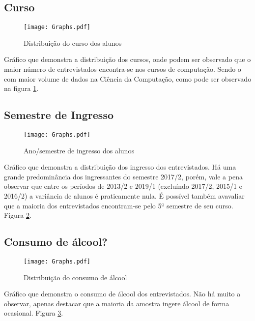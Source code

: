 \documentclass[11pt]{scrartcl} %
\begin{document}
\clearpage

\subsection{Curso}

\begin{figure}[h]
  \centering
  \texttt{[image: Graphs.pdf]}
  \caption{Distribuição do curso dos alunos}
  \label{fig:graph1}
\end{figure}

Gráfico que demonstra a distribuição dos cursos, onde podem ser observado que o maior número de entrevistados encontra-se nos cursos de computação. Sendo o com maior volume de dados na Ciência da Computação, como pode ser observado na figura \ref{fig:graph1}.

\clearpage

\subsection{Semestre de Ingresso}

\begin{figure}[h]
  \centering
  \texttt{[image: Graphs.pdf]}
  \label{fig:graph2}
  \caption{Ano/semestre de ingresso dos alunos}
\end{figure}

Gráfico que demonstra a distribuição dos ingresso dos entrevistados. Há uma grande predominância dos ingressantes do semestre 2017/2, porém, vale a pena observar que entre os períodos de 2013/2 e 2019/1 (excluíndo 2017/2, 2015/1 e 2016/2) a variância de alunos é praticamente nula. É possível também avavaliar que a maioria dos entrevistados encontram-se pelo 5º semestre de seu curso. Figura \ref{fig:graph2}.

\clearpage

\subsection{Consumo de álcool?}

\begin{figure}[h]
  \centering
  \texttt{[image: Graphs.pdf]}
  \label{fig:graph3}
  \caption{Distribuição do consumo de álcool}
\end{figure}

Gráfico que demonstra o consumo de álcool dos entrevistados. Não há muito a observar, apenas destacar que a maioria da amostra ingere álcool de forma ocasional.  Figura \ref{fig:graph3}.
\end{document}
